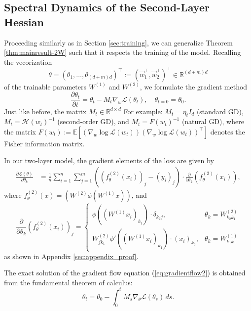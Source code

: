 \documentclass{article}
\begin{document}
\subsection{Spectral Dynamics of the Second-Layer Hessian}
Proceeding similarly as in Section \ref{sec:training}, we can generalize Theorem \ref{thm:mainresult-2W} such that it respects the training of the model. Recalling the vecorization
\begin{equation}
\theta=(\theta_1,\dots,\theta_{(d+m)d})^\top:=(\vec{w}_1^\top,\vec{w}_2^\top)^\top\in\mathbb{R}^{(d+m)d}
\end{equation}
of the trainable parameters $W^{(1)}$ and $W^{(2)}$, we formulate the gradient method
\begin{equation}
\frac{\partial \theta_t}{\partial t} = \theta_t-M_t\nabla_w\mathcal{L}(\theta_t),\quad \theta_{t=0}=\theta_0.\label{eq:gradientflow2}
\end{equation}
Just like before, the matrix $M_t\in\mathbb{R}^{d\times d}$ For example: $M_t=\eta_tI_d$ (standard GD), $M_t=\mathcal{H}(w_t)^{-1}$ (second-order GD), and $M_t=F(w_t)^{-1}$ (natural GD), where the matrix
$F(w_t):=\mathbb{E}\left[(\nabla_w\log \mathcal{L}(w_t))(\nabla_w\log \mathcal{L}(w_t))^\top \right]$ denotes the Fisher information matrix.
\smallskip
\par
In our two-layer model, the gradient elements of the loss are given by
\begin{align}
\frac{\partial\mathcal{L}(\theta)}{\partial \theta_k} &= \frac{1}{n}\sum_{i=1}^n\sum_{j=1}^m((f_\theta^{(2)}(x_i))_j-(y_i)_j)\cdot\frac{\partial}{\partial\theta_k}(f_\theta^{(2)}(x_i)),
\end{align}
where $f_\theta^{(2)}(x)=({W^{(2)}} \phi({W^{(1)}} x))$, and
\begin{equation}
\frac{\partial}{\partial\theta_k}(f_\theta^{(2)}(x_i))_j = \begin{cases}  \phi\left((W^{(1)}x_i)_{k_1}\right)\cdot\delta_{k_2j}, & \theta_k=W_{k_2k_1}^{(2)}\\
W_{jk_1}^{(2)}\phi'\left((W^{(1)}x_i)_{k_1}\right)\cdot (x_i)_{k_0}, & \theta_k=W_{k_1k_0}^{(1)}\end{cases}
\end{equation}
as shown in Appendix \ref{sec:appendix_proof}.
\smallskip
\par
The exact solution of the gradient flow equation (\ref{eq:gradientflow2}) is obtained from the fundamental theorem of calculus:
\begin{equation}
\theta_t=\theta_0-\int_0^t M_s\nabla_\theta\mathcal{L}(\theta_s)\,ds.\label{eq:GD2}
\end{equation}
\end{document}

